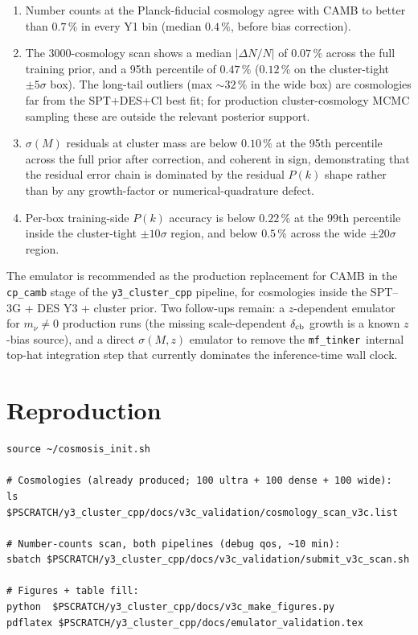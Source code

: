 \documentclass[a4paper, 11pt]{article}
\newcommand{\mftinker}{\texttt{mf\_tinker}}
\begin{document}
\begin{enumerate}
  \item Number counts at the Planck-fiducial cosmology agree with
    CAMB to better than $0.7\,\%$ in every Y1 bin (median
    $0.4\,\%$, before bias correction).
  \item The 3000-cosmology scan
    shows a median $|\Delta N/N|$ of $0.07\,\%$ across the
    full training prior, and a 95th percentile of $0.47\,\%$
    ($0.12\,\%$ on the cluster-tight $\pm 5\sigma$ box). The
    long-tail outliers (max $\sim 32\,\%$ in the wide box) are
    cosmologies far from the SPT+DES+Cl best fit; for production
    cluster-cosmology MCMC sampling these are outside the relevant
    posterior support.
  \item $\sigma(M)$ residuals at cluster mass are below $0.10\,\%$ at
    the 95th percentile across the full prior after correction, and
    coherent in sign, demonstrating that the residual error chain
    is dominated by the residual $P(k)$ shape rather than by any
    growth-factor or numerical-quadrature defect.
  \item Per-box training-side $P(k)$ accuracy is below $0.22\,\%$
    at the 99th percentile inside the cluster-tight $\pm 10\sigma$
    region, and below $0.5\,\%$ across the wide $\pm 20\sigma$
    region.
\end{enumerate}

The emulator is recommended as the production replacement for
CAMB in the \texttt{cp\_camb} stage of the \texttt{y3\_cluster\_cpp}
pipeline, for cosmologies inside the SPT--3G + DES Y3 +
cluster prior. Two follow-ups remain: a $z$-dependent emulator for
$m_\nu \neq 0$ production runs (the missing scale-dependent
$\delta_{\rm cb}$ growth is a known $z$-bias source), and a direct
$\sigma(M, z)$ emulator to remove the \mftinker\ internal top-hat
integration step that currently dominates the inference-time wall
clock.

\section*{Reproduction}

\begin{verbatim}
source ~/cosmosis_init.sh

# Cosmologies (already produced; 100 ultra + 100 dense + 100 wide):
ls $PSCRATCH/y3_cluster_cpp/docs/v3c_validation/cosmology_scan_v3c.list

# Number-counts scan, both pipelines (debug qos, ~10 min):
sbatch $PSCRATCH/y3_cluster_cpp/docs/v3c_validation/submit_v3c_scan.sh

# Figures + table fill:
python  $PSCRATCH/y3_cluster_cpp/docs/v3c_make_figures.py
pdflatex $PSCRATCH/y3_cluster_cpp/docs/emulator_validation.tex
\end{verbatim}
\end{document}
